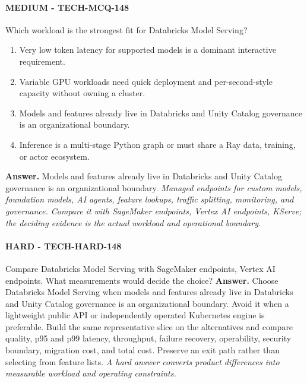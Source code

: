\paragraph{MEDIUM - TECH-MCQ-148} Which workload is the strongest fit for Databricks Model Serving?
\begin{enumerate}[label=\Alph*.]
\item Very low token latency for supported models is a dominant interactive requirement.
\item Variable GPU workloads need quick deployment and per-second-style capacity without owning a cluster.
\item Models and features already live in Databricks and Unity Catalog governance is an organizational boundary.
\item Inference is a multi-stage Python graph or must share a Ray data, training, or actor ecosystem.
\end{enumerate}
\textbf{Answer.} Models and features already live in Databricks and Unity Catalog governance is an organizational boundary.
\textit{Managed endpoints for custom models, foundation models, AI agents, feature lookups, traffic splitting, monitoring, and governance. Compare it with SageMaker endpoints, Vertex AI endpoints, KServe; the deciding evidence is the actual workload and operational boundary.}
\paragraph{HARD - TECH-HARD-148} Compare Databricks Model Serving with SageMaker endpoints, Vertex AI endpoints. What measurements would decide the choice?
\textbf{Answer.} Choose Databricks Model Serving when models and features already live in Databricks and Unity Catalog governance is an organizational boundary. Avoid it when a lightweight public API or independently operated Kubernetes engine is preferable. Build the same representative slice on the alternatives and compare quality, p95 and p99 latency, throughput, failure recovery, operability, security boundary, migration cost, and total cost. Preserve an exit path rather than selecting from feature lists.
\textit{A hard answer converts product differences into measurable workload and operating constraints.}

